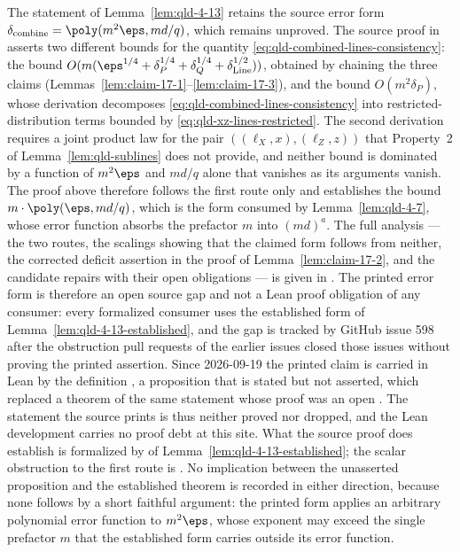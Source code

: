 \begin{remark}
	\label{rem:qld-4-13-source-defects}
	The statement of Lemma~\ref{lem:qld-4-13} retains the source error
	form $\delta_{\mathrm{combine}} = \poly(m^2\eps, md/q)$, which
	remains unproved. The source proof in \cite{Ji2020MIPStar} asserts
	two different bounds for the quantity
	\eqref{eq:qld-combined-lines-consistency}: the bound
	$O(m(\eps^{1/4} + \delta_P^{1/4} + \delta_Q^{1/4} +
	\delta_{\mathrm{Line}}^{1/2}))$, obtained by chaining the three
	claims (Lemmas~\ref{lem:claim-17-1}--\ref{lem:claim-17-3}), and the
	bound $O(m^2 \delta_P)$, whose derivation decomposes
	\eqref{eq:qld-combined-lines-consistency} into
	restricted-distribution terms bounded by
	\eqref{eq:qld-xz-lines-restricted}. The second derivation requires a
	joint product law for the pair $((\ell_X, x), (\ell_Z, z))$ that
	Property~2 of Lemma~\ref{lem:qld-sublines} does not provide, and
	neither bound is dominated by a function of $m^2\eps$ and $md/q$
	alone that vanishes as its arguments vanish. The proof above
	therefore follows the first route only and establishes the bound
	$m \cdot \poly(\eps, md/q)$, which is the form consumed by
	Lemma~\ref{lem:qld-4-7}, whose error function absorbs the prefactor
	$m$ into $(md)^a$. The full analysis --- the two routes, the scalings
	showing that the claimed form follows from neither, the corrected
	deficit assertion in the proof of Lemma~\ref{lem:claim-17-2}, and the
	candidate repairs with their open obligations --- is given in
	\cite{gap:qpbt_combined-lines-error-term}.
	The printed error form is therefore an open source gap and not a Lean proof
	obligation of any consumer: every formalized consumer uses the established
	form of Lemma~\ref{lem:qld-4-13-established}, and the gap is tracked by
	GitHub issue 598 after the obstruction pull requests of the earlier issues
	closed those issues without proving the printed assertion.
	Since 2026-09-19 the printed claim is carried in Lean by the definition
	, a proposition that is
	stated but not asserted, which replaced a theorem of the same statement whose
	proof was an open . The statement the source prints is thus
	neither proved nor dropped, and the Lean development carries no proof debt at
	this site. What the source proof does establish is formalized by
	 of
	Lemma~\ref{lem:qld-4-13-established}; the scalar obstruction to the first
	route is .
	No implication between the unasserted proposition and the established theorem
	is recorded in either direction, because none follows by a short faithful
	argument: the printed form applies an arbitrary polynomial error function to
	$m^2\eps$, whose exponent may exceed the single prefactor $m$ that the
	established form carries outside its error function.
\end{remark}

